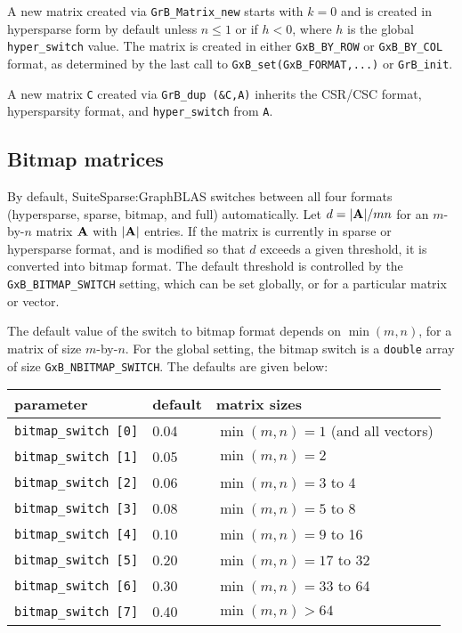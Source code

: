 \documentclass[12pt]{article}
\begin{document}
A new matrix created via \verb'GrB_Matrix_new' starts with $k=0$ and is created
in hypersparse form by default unless $n \le 1$ or if $h<0$, where $h$ is the
global \verb'hyper_switch' value.  The matrix is created in either
\verb'GxB_BY_ROW' or \verb'GxB_BY_COL' format, as determined by the last call
to \verb'GxB_set(GxB_FORMAT,...)' or \verb'GrB_init'.

A new matrix \verb'C' created via \verb'GrB_dup (&C,A)' inherits the CSR/CSC
format, hypersparsity format, and \verb'hyper_switch' from \verb'A'.

\subsection{Bitmap matrices}
\label{bitmap_switch}

By default, SuiteSparse:GraphBLAS switches between all four formats
(hypersparse, sparse, bitmap, and full) automatically.  Let $d = |{\bf A}|/mn$
for an $m$-by-$n$ matrix $\bf A$ with $|{\bf A}|$ entries.  If the matrix is
currently in sparse or hypersparse format, and is modified so that $d$ exceeds
a given threshold, it is converted into bitmap format.  The default threshold
is controlled by the \verb'GxB_BITMAP_SWITCH' setting, which can be set
globally, or for a particular matrix or vector.

The default value of the switch to bitmap format depends on $\min(m,n)$, for a
matrix of size $m$-by-$n$.  For the global setting, the bitmap switch is a
\verb'double' array of size \verb'GxB_NBITMAP_SWITCH'.  The defaults are given
below:

\vspace{0.2in}
{\small
\begin{tabular}{lll}
parameter & default & matrix sizes \\
\hline
\verb'bitmap_switch [0]' & 0.04 & $\min(m,n) = 1$ (and all vectors) \\
\verb'bitmap_switch [1]' & 0.05 & $\min(m,n) = 2$ \\
\verb'bitmap_switch [2]' & 0.06 & $\min(m,n) = 3$ to 4 \\
\verb'bitmap_switch [3]' & 0.08 & $\min(m,n) = 5$ to 8 \\
\verb'bitmap_switch [4]' & 0.10 & $\min(m,n) = 9$ to 16\\
\verb'bitmap_switch [5]' & 0.20 & $\min(m,n) = 17$ to 32\\
\verb'bitmap_switch [6]' & 0.30 & $\min(m,n) = 33$ to 64 \\
\verb'bitmap_switch [7]' & 0.40 & $\min(m,n) > 64$ \\
\end{tabular}
}
\vspace{0.2in}
\end{document}
